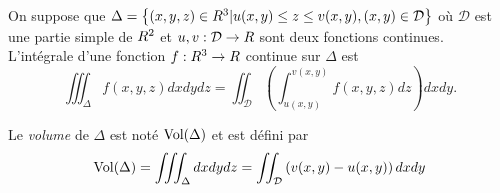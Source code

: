 \begin{definition}
On suppose que $\Delta = \left\{ (x,y,z) \in R^3 |  u(x,y) \leq z \leq v(x,y) , (x,y) \in \mathcal D\right\}$ où $\mathcal D$ est une partie simple de $R^2$ et $u,v:\mathcal D \to R $ sont deux fonctions continues. L'intégrale d'une fonction $f:R^3 \to R$ continue sur $\Delta$ est 
\[
		\iiint_{\Delta} f(x,y,z) dxdydz = \iint_{\mathcal D} \left( \int_{u(x,y)}^{v(x,y)} f(x,y,z) dz \right) dxdy.
\]
\end{definition}

\begin{definition}
	Le \emph{volume} de $\Delta$ est noté $\operatorname{Vol}(\Delta)$ et est défini par
	\[
		\operatorname{Vol}(\Delta) = \iiint_{\Delta} dxdydz = \iint_{\mathcal D} \left( v(x,y) - u(x,y) \right) dxdy 
	\]
\end{definition}








